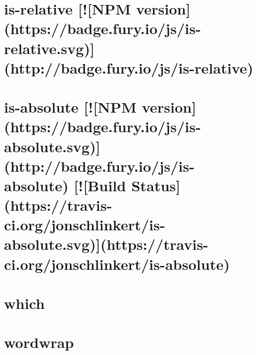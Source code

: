 \documentclass[twoside]{book}
\newcommand{\+}{\discretionary{\mbox{\scriptsize$\hookleftarrow$}}{}{}}
\begin{document}
\chapter{is-\/relative \mbox{[}!\mbox{[}N\+P\+M version\mbox{]}(https\+://badge.fury.\+io/js/is-\/relative.svg)\mbox{]}(http\+://badge.fury.\+io/js/is-\/relative)}
\label{md__c_1__users_martin__documents__git_hub_visual_studio__bachelor__wis_r__wis_r_node_modules_istadb491c2afae6ae51e9ed1c3e33d33cb}
\hypertarget{md__c_1__users_martin__documents__git_hub_visual_studio__bachelor__wis_r__wis_r_node_modules_istadb491c2afae6ae51e9ed1c3e33d33cb}{}

\chapter{is-\/absolute \mbox{[}!\mbox{[}N\+P\+M version\mbox{]}(https\+://badge.fury.\+io/js/is-\/absolute.svg)\mbox{]}(http\+://badge.fury.\+io/js/is-\/absolute) \mbox{[}!\mbox{[}Build Status\mbox{]}(https\+://travis-\/ci.org/jonschlinkert/is-\/absolute.svg)\mbox{]}(https\+://travis-\/ci.org/jonschlinkert/is-\/absolute)}
\label{md__c_1__users_martin__documents__git_hub_visual_studio__bachelor__wis_r__wis_r_node_modules_ista656c29c952f07b4128575d0f82824d5}
\hypertarget{md__c_1__users_martin__documents__git_hub_visual_studio__bachelor__wis_r__wis_r_node_modules_ista656c29c952f07b4128575d0f82824d5}{}

\chapter{which}
\label{md__c_1__users_martin__documents__git_hub_visual_studio__bachelor__wis_r__wis_r_node_modules_istafd8013372e3d7b1d104cb06af168ec3}
\hypertarget{md__c_1__users_martin__documents__git_hub_visual_studio__bachelor__wis_r__wis_r_node_modules_istafd8013372e3d7b1d104cb06af168ec3}{}

\chapter{wordwrap}
\label{md__c_1__users_martin__documents__git_hub_visual_studio__bachelor__wis_r__wis_r_node_modules_ist2cc5e177a5cdf04fe601b9d25fc929bf}
\hypertarget{md__c_1__users_martin__documents__git_hub_visual_studio__bachelor__wis_r__wis_r_node_modules_ist2cc5e177a5cdf04fe601b9d25fc929bf}{}

\end{document}
